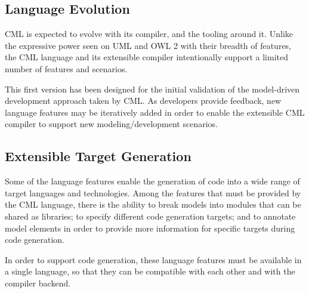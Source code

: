 \subsection{Language Evolution}

CML is expected to evolve with its compiler, and the tooling around it.
Unlike the expressive power seen on UML \cite{uml} and OWL 2 \cite{owl2} with their breadth of features,
the CML language and its extensible compiler intentionally support a limited number of features and scenarios.

This first version has been designed for the initial validation of the model-driven development approach taken by CML.
As developers provide feedback,
new language features may be iteratively added in order to enable the extensible CML compiler to support new modeling/development scenarios.

\subsection{Extensible Target Generation}

Some of the language features enable the generation of code into a wide range of target languages and technologies. Among the features that must be provided by the CML language,
there is the ability to break models into modules that can be shared as libraries;
to specify different code generation targets;
and to annotate model elements in order to provide more information for specific targets during code generation.

In order to support code generation, these language features must be available in a single language, so that they can be compatible with each other and with the compiler backend.

